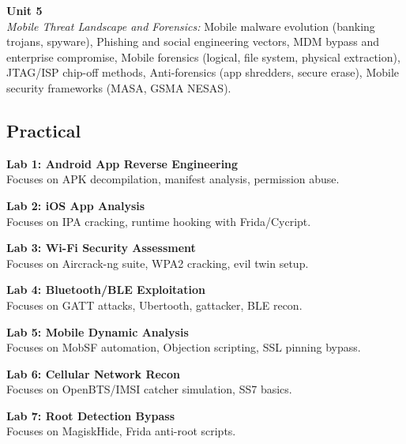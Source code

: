 \vspace{0.3cm}

\noindent\textbf{Unit 5} \\
\textit{Mobile Threat Landscape and Forensics:} Mobile malware evolution (banking trojans, spyware), Phishing and social engineering vectors, MDM bypass and enterprise compromise, Mobile forensics (logical, file system, physical extraction), JTAG/ISP chip-off methods, Anti-forensics (app shredders, secure erase), Mobile security frameworks (MASA, GSMA NESAS).

\newpage

\subsection*{Practical}
\noindent\textbf{Lab 1: Android App Reverse Engineering} \\
Focuses on APK decompilation, manifest analysis, permission abuse.

\vspace{0.2cm}

\noindent\textbf{Lab 2: iOS App Analysis} \\
Focuses on IPA cracking, runtime hooking with Frida/Cycript.

\vspace{0.2cm}

\noindent\textbf{Lab 3: Wi-Fi Security Assessment} \\
Focuses on Aircrack-ng suite, WPA2 cracking, evil twin setup.

\vspace{0.2cm}

\noindent\textbf{Lab 4: Bluetooth/BLE Exploitation} \\
Focuses on GATT attacks, Ubertooth, gattacker, BLE recon.

\vspace{0.2cm}

\noindent\textbf{Lab 5: Mobile Dynamic Analysis} \\
Focuses on MobSF automation, Objection scripting, SSL pinning bypass.

\vspace{0.2cm}

\noindent\textbf{Lab 6: Cellular Network Recon} \\
Focuses on OpenBTS/IMSI catcher simulation, SS7 basics.

\vspace{0.2cm}

\noindent\textbf{Lab 7: Root Detection Bypass} \\
Focuses on MagiskHide, Frida anti-root scripts.

